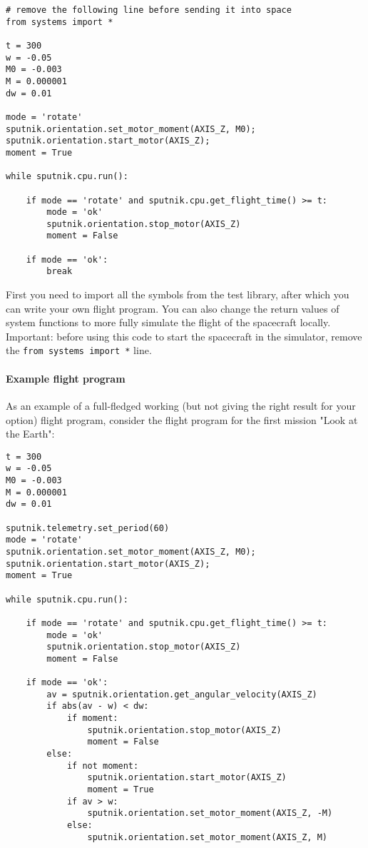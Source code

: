 \documentclass[12pt,a4paper]{article}
\begin{document}
\begin{verbatim}
# remove the following line before sending it into space
from systems import *

t = 300
w = -0.05
M0 = -0.003
M = 0.000001
dw = 0.01

mode = 'rotate'
sputnik.orientation.set_motor_moment(AXIS_Z, M0);
sputnik.orientation.start_motor(AXIS_Z);
moment = True

while sputnik.cpu.run():

    if mode == 'rotate' and sputnik.cpu.get_flight_time() >= t:
        mode = 'ok'
        sputnik.orientation.stop_motor(AXIS_Z)
        moment = False

    if mode == 'ok':
        break
\end{verbatim}

First you need to import all the symbols from the test library, after which you can write your own flight program. You can also change the return values of system functions to more fully simulate the flight of the spacecraft locally. Important: before using this code to start the spacecraft in the simulator, remove the \verb'from systems import *' line.

\paragraph{Example flight program}

As an example of a full-fledged working (but not giving the right result for your option) flight program, consider the flight program for the first mission "Look at the Earth":

\begin{verbatim}
t = 300
w = -0.05
M0 = -0.003
M = 0.000001
dw = 0.01

sputnik.telemetry.set_period(60)
mode = 'rotate'
sputnik.orientation.set_motor_moment(AXIS_Z, M0);
sputnik.orientation.start_motor(AXIS_Z);
moment = True

while sputnik.cpu.run():

    if mode == 'rotate' and sputnik.cpu.get_flight_time() >= t: 
        mode = 'ok'
        sputnik.orientation.stop_motor(AXIS_Z)
        moment = False

    if mode == 'ok':
        av = sputnik.orientation.get_angular_velocity(AXIS_Z)
        if abs(av - w) < dw:
            if moment:
                sputnik.orientation.stop_motor(AXIS_Z)
                moment = False
        else:
            if not moment:
                sputnik.orientation.start_motor(AXIS_Z)
                moment = True
            if av > w:
                sputnik.orientation.set_motor_moment(AXIS_Z, -M)
            else:
                sputnik.orientation.set_motor_moment(AXIS_Z, M)
\end{verbatim}
\end{document}
